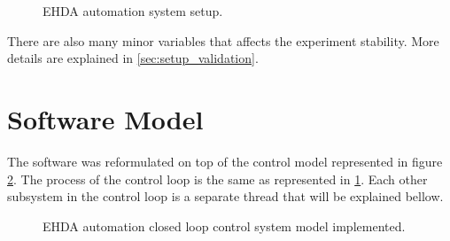 \begin{figure}[H]
  \centering
  \caption{EHDA automation system setup.}
  \label{fig:setup}
\end{figure}

There are also many minor variables that affects the experiment stability. More details are explained in \ref{sec:setup_validation}.


\section{Software Model}
\label{sec:control_model}

The software was reformulated on top of the control model represented in figure \ref{fig:control_model_fig}. The process of the control loop is the same as represented in \ref{fig:setup}. 
Each other subsystem in the control loop is a separate thread that will be explained bellow.

\begin{figure}[H]
  \centering
  \caption{EHDA automation closed loop control system model implemented.}
  \label{fig:control_model_fig}
\end{figure}

